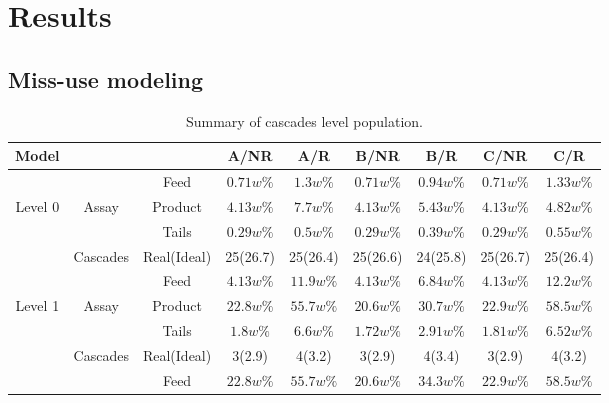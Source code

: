 \section{Results}

\subsection{Miss-use modeling}

\begin{table}[h!]
\centering
  \caption{Summary of cascades level population.}
\begin{tabular}{ccccccccc}
\toprule

Model       &        &            & A/NR      & A/R       & B/NR      & B/R      & C/NR       & C/R       \\
\midrule                                                                                                 
        &            & Feed       & $0.71w\%$ & $1.3w\%$  & $0.71w\%$ & $0.94w\%$ & $0.71w\%$ & $1.33w\%$ \\
Level 0 & Assay      & Product    & $4.13w\%$ & $7.7w\%$  & $4.13w\%$ & $5.43w\%$ & $4.13w\%$ & $4.82w\%$ \\
        &            & Tails      & $0.29w\%$ & $0.5w\%$  & $0.29w\%$ & $0.39w\%$ & $0.29w\%$ & $0.55w\%$ \\
        & Cascades   & Real(Ideal)& 25(26.7)  & 25(26.4)  & 25(26.6)  & 24(25.8)  & 25(26.7)  & 25(26.4)  \\
\midrule                                                                                                 
        &            & Feed       & $4.13w\%$ & $11.9w\%$ & $4.13w\%$ & $6.84w\%$ & $4.13w\%$ & $12.2w\%$ \\
Level 1 & Assay      & Product    & $22.8w\%$ & $55.7w\%$ & $20.6w\%$ & $30.7w\%$ & $22.9w\%$ & $58.5w\%$ \\
        &            & Tails      & $1.8w\%$  & $6.6w\%$  & $1.72w\%$ & $2.91w\%$ & $1.81w\%$ & $6.52w\%$ \\
        & Cascades   & Real(Ideal)& 3(2.9)    & 4(3.2)    & 3(2.9)    & 4(3.4)    & 3(2.9)    & 4(3.2)    \\
\midrule                                                                                                 
        &            & Feed       & $22.8w\%$ & $55.7w\%$ & $20.6w\%$ & $34.3w\%$ & $22.9w\%$ & $58.5w\%$ \\

\end{tabular}
\end{table}
